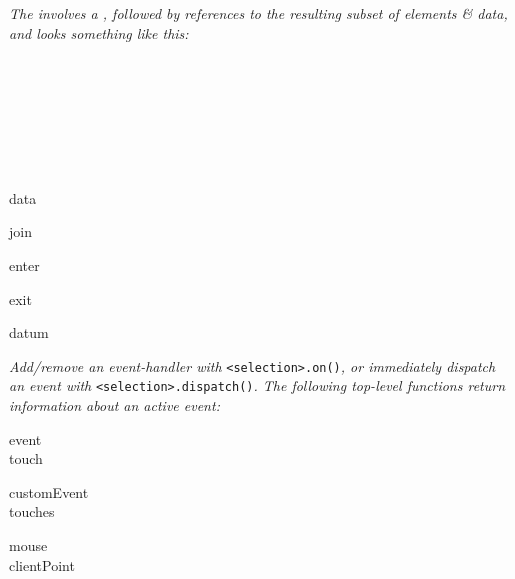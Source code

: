 \textit{The \href{https://bost.ocks.org/mike/join/}{} involves a , followed by references to the resulting subset of elements \& data, and looks something like this:}

\\
\\
\\
\\
\\
\\

{\footnotesize 
\begin{minipage}[t]{1.2cm}
    data
\end{minipage}
\begin{minipage}[t]{1.2cm}
    join
\end{minipage}
\begin{minipage}[t]{1.2cm}
    enter
\end{minipage}
\begin{minipage}[t]{1.2cm}
    exit
\end{minipage}
\begin{minipage}[t]{1.2cm}
    datum
\end{minipage}
}


\textit{Add/remove an event-handler with }\texttt{<selection>.on()}\textit{, or immediately dispatch an event with }\texttt{<selection>.dispatch()}\textit{. The following top-level functions return information about an active event:}

{\footnotesize 
\begin{minipage}[t]{2.0cm}
    event\\
    touch
\end{minipage}
\begin{minipage}[t]{2.0cm}
    customEvent\\
    touches
\end{minipage}
\begin{minipage}[t]{2.0cm}
    mouse\\
    clientPoint
\end{minipage}
}



